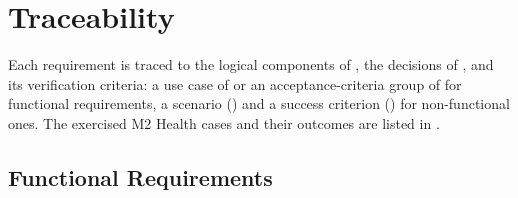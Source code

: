 \section{Traceability}\label{sec:7}

Each requirement is traced to the logical components of , the
decisions of , and its verification criteria: a use case of 
or an acceptance-criteria group of  for functional
requirements, a scenario () and a success criterion () for non-functional ones.
The exercised M2 Health cases and their outcomes are listed in
.

\subsection{Functional Requirements}\label{sec:7.1}

